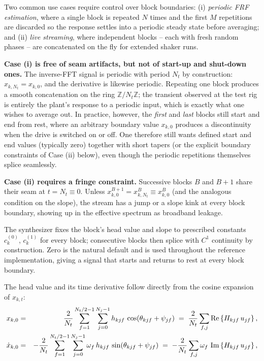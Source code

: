 \documentclass[10pt,a4paper]{article}
\numberwithin{equation}{section}
\DeclarePairedDelimiter\mat{(}{)}
\DeclareMathOperator{\Real}{Re}
\DeclareMathOperator{\Imag}{Im}
\newcommand{\re}[1]{\Real\left\{#1\right\}}
\newcommand{\im}[1]{\Imag\left\{#1\right\}}
\begin{document}
Two common use cases require control over block boundaries: (i) \emph{periodic FRF estimation}, where a single block is repeated $N$ times and the first $M$ repetitions are discarded so the response settles into a periodic steady state before averaging; and (ii) \emph{live streaming}, where independent blocks -- each with fresh random phases -- are concatenated on the fly for extended shaker runs.

\textbf{Case (i) is free of seam artifacts, but not of start-up and shut-down ones.} The inverse-FFT signal is periodic with period $N_t$ by construction: $x_{k, N_t} = x_{k, 0}$, and the derivative is likewise periodic. Repeating one block produces a smooth concatenation on the ring $\mathbb{Z}/N_t\mathbb{Z}$; the transient observed at the test rig is entirely the plant's response to a periodic input, which is exactly what one wishes to average out. In practice, however, the \emph{first} and \emph{last} blocks still start and end from rest, where an arbitrary boundary value $x_{k,0}$ produces a discontinuity when the drive is switched on or off. One therefore still wants defined start and end values (typically zero) together with short tapers (or the explicit boundary constraints of Case (ii) below), even though the periodic repetitions themselves splice seamlessly.

\textbf{Case (ii) requires a fringe constraint.} Successive blocks $B$ and $B{+}1$ share their seam at $t=N_t \equiv 0$. Unless $x^{B+1}_{k, 0} = x^{B}_{k, N_t} \equiv x^{B}_{k, 0}$ (and the analogous condition on the slope), the stream has a jump or a slope kink at every block boundary, showing up in the effective spectrum as broadband leakage. 

The synthesizer fixes the block's head value and slope to prescribed constants $c^{(0)}_k$, $c^{(1)}_k$ for every block; consecutive blocks then splice with $C^1$ continuity by construction. Zero is the natural default and is used throughout the reference implementation, giving a signal that starts and returns to rest at every block boundary.

The head value and its time derivative follow directly from the cosine expansion of $x_{k,t}$:
\begin{eqnarray}
	x_{k, 0} &=& \frac{2}{N_t}\sum_{f=1}^{N_t/2-1}\sum_{j=0}^{N_j-1} h_{k j f}\,
					\cos\mat{\theta_{k j f}+\psi_{j f}}
			\;=\; \frac{2}{N_t}\sum_{f,j}\re{H_{k j f}\, u_{j f}}, \\
	\dot x_{k, 0} &=& -\frac{2}{N_t}\sum_{f=1}^{N_t/2-1}\sum_{j=0}^{N_j-1} 
					\omega_f\,h_{k j f}\,\sin\mat{\theta_{k j f}+\psi_{j f}}
				  \;=\; -\frac{2}{N_t}\sum_{f,j}\omega_f\,\im{H_{k j f}\, u_{j f}},
\end{eqnarray}
\end{document}

